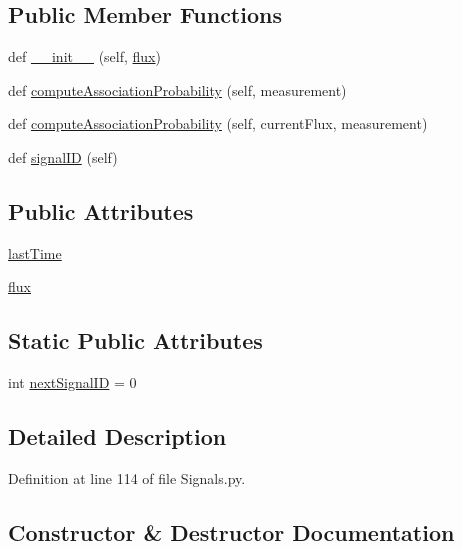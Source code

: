 \subsection*{Public Member Functions}
\begin{DoxyCompactItemize}
\item 
def \hyperlink{classSignals_1_1StaticPoissonSource_a71ff9a86dc2d7e1a89e5f40e0de5f20e}{\+\_\+\+\_\+init\+\_\+\+\_\+} (self, \hyperlink{classSignals_1_1PoissonSource_a26e7bf25b1d9195bfded2a3ad6790bce}{flux})
\item 
def \hyperlink{classSignals_1_1StaticPoissonSource_a61351ebf4f75f28e227cfee7ca7e5d64}{compute\+Association\+Probability} (self, measurement)
\item 
def \hyperlink{classSignals_1_1PoissonSource_a8e7a6023e7ee53ed0b5b81c7d0aa361c}{compute\+Association\+Probability} (self, current\+Flux, measurement)
\item 
def \hyperlink{classSignals_1_1SignalSource_a85016cca8a7f1e188d314ced50577d05}{signal\+ID} (self)
\end{DoxyCompactItemize}
\subsection*{Public Attributes}
\begin{DoxyCompactItemize}
\item 
\hyperlink{classSignals_1_1PoissonSource_a66b0f3fb48cc130b6b07d7427092a522}{last\+Time}
\item 
\hyperlink{classSignals_1_1PoissonSource_a26e7bf25b1d9195bfded2a3ad6790bce}{flux}
\end{DoxyCompactItemize}
\subsection*{Static Public Attributes}
\begin{DoxyCompactItemize}
\item 
int \hyperlink{classSignals_1_1SignalSource_abcff0d069f17cb5ebe3eff15b6283a64}{next\+Signal\+ID} = 0
\end{DoxyCompactItemize}


\subsection{Detailed Description}


Definition at line 114 of file Signals.\+py.



\subsection{Constructor \& Destructor Documentation}
